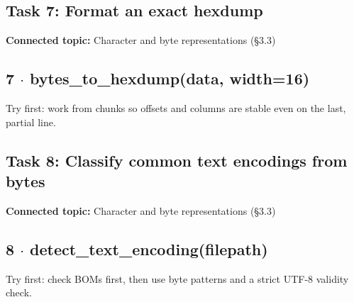 \documentclass[11pt]{article}
\begin{document}
\begin{keepsection}
\section{Task 7: Format an exact hexdump}

\textbf{Connected topic:} Character and byte representations (§3.3)

\begin{keepsection}
\subsection{7 \ensuremath{\cdot} bytes\_to\_hexdump(data, width=16)}

Try first: work from chunks so offsets and columns are stable even on the last, partial line.

\end{keepsection}
\end{keepsection}

\begin{keepsection}
\section{Task 8: Classify common text encodings from bytes}

\textbf{Connected topic:} Character and byte representations (§3.3)

\begin{keepsection}
\subsection{8 \ensuremath{\cdot} detect\_text\_encoding(filepath)}

Try first: check BOMs first, then use byte patterns and a strict UTF-8 validity check.

\end{keepsection}
\end{keepsection}
\end{document}
